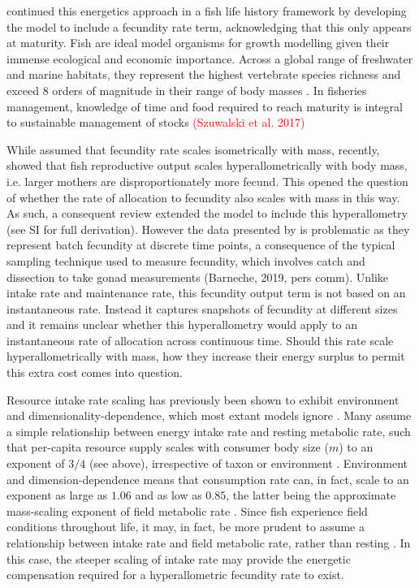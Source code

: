 \documentclass[a4paper]{article} %
\begin{document}
    \cite{Charnov2001} continued this energetics approach in a fish life history framework by developing the \cite{West2001} model to include a fecundity rate term, acknowledging that this only appears at maturity. Fish are ideal model organisms for growth modelling given their immense ecological and economic importance. Across a global range of freshwater and marine habitats, they represent the highest vertebrate species richness and exceed 8 orders of magnitude in their range of body masses \autocite{Barneche2018c}. In fisheries management, knowledge of time  and food required to reach maturity is integral to sustainable management of stocks \textcolor{red}{(Szuwalski et al. 2017)}
    
    While \cite{Charnov2001} assumed that fecundity rate scales isometrically with mass, recently, \cite{Barneche2018-reproductive_output} showed that fish reproductive output scales hyperallometrically with body mass, i.e. larger mothers are disproportionately more fecund. This opened the question of whether the rate of allocation to fecundity also scales with mass in this way. As such, a consequent review extended the \cite{Charnov2001} model to include this hyperallometry \autocite{Marshall2019b} (see SI for full derivation). However the data presented by \cite{Barneche2018-reproductive_output} is problematic as they represent batch fecundity at discrete time points, a consequence of the typical sampling technique used to measure fecundity, which involves catch and dissection to take gonad measurements (Barneche, 2019, pers comm). Unlike intake rate and maintenance rate, this fecundity output term is not based on an instantaneous rate. Instead it captures snapshots of fecundity at different sizes and it remains unclear whether this hyperallometry would apply to an instantaneous rate of allocation across continuous time. Should this rate scale hyperallometrically with mass, how they increase their energy surplus to permit this extra cost comes into question.

    Resource intake rate scaling has previously been shown to exhibit environment and dimensionality-dependence, which most extant models ignore \autocite{Pawar2012}. Many assume a simple relationship between energy intake rate and resting metabolic rate, such that per-capita resource supply scales with consumer body size ($m$) to an exponent of $3/4$ (see above), irrespective of taxon or environment \autocite{Pawar2012}. Environment and dimension-dependence means that consumption rate can, in fact, scale to an exponent as large as $1.06$ and as low as $0.85$, the latter being the approximate mass-scaling exponent of field metabolic rate \autocite{peters1983,Weibel2004, Pawar2012}. Since fish experience field conditions throughout life, it may, in fact, be more prudent to assume a relationship between intake rate and field metabolic rate, rather than resting \autocite{Boisclair1993}. In this case, the steeper scaling of intake rate may provide the energetic compensation required for a hyperallometric fecundity rate to exist.
\end{document}
